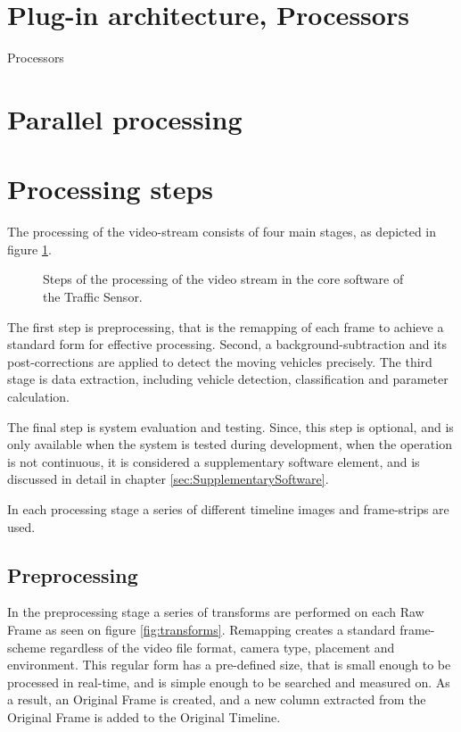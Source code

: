 \section{Plug-in architecture, Processors}
Processors

\section{Parallel processing}
\section{Processing steps}
The processing of the video-stream consists of four main stages, as depicted in figure \ref{fig:processing_steps}.

\begin{figure}[bh]
	\centering
	
	\caption{Steps of the processing of the video stream in the core software of the Traffic Sensor.\label{fig:processing_steps}}
\end{figure}

The first step is preprocessing, that is the remapping of each frame to achieve a standard form for effective processing.
Second, a background-subtraction and its post-corrections are applied to detect the moving vehicles precisely.
The third stage is data extraction, including vehicle detection, classification and parameter calculation.

The final step is system evaluation and testing. 
Since, this step is optional, and is only available when the system is tested during development, when the operation is not continuous, it is considered a supplementary software element, and is discussed in detail in chapter \ref{sec:SupplementarySoftware}.

In each processing stage a series of different timeline images and frame-strips are used.
\subsection{Preprocessing}
In the preprocessing stage a series of transforms are performed on each Raw Frame as seen on figure \ref{fig:transforms}.
Remapping creates a standard frame-scheme regardless of the video file format, camera type, placement and environment.
This regular form has a pre-defined size, that is small enough to be processed in real-time, and is simple enough to be searched and measured on.
As a result, an Original Frame is created, and a new column extracted from the Original Frame is added to the Original Timeline.

